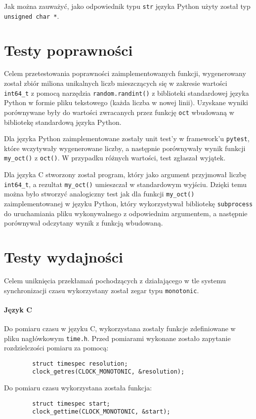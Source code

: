 \documentclass[11pt]{article}
\begin{document}
	Jak można zauważyć, jako odpowiednik typu \texttt{str} języka Python użyty został typ \texttt{unsigned char *}.

	\section{Testy poprawności}
	Celem przetestowania poprawności zaimplementowanych funkcji, 
	wygenerowany został zbiór miliona unikalnych liczb mieszczących się w zakresie wartości \texttt{int64\_t} 
	z pomocą narzędzia \texttt{random.randint()} z biblioteki standardowej języka Python w formie pliku tekstowego
	(każda liczba w nowej linii). Uzyskane wyniki porównywane były do wartości zwracanych przez funkcję \texttt{oct}
	wbudowaną w bibliotekę standardową języka Python.

	Dla języka Python zaimplementowane zostały unit test'y w framework'u \texttt{pytest}, które wczytywały wygenerowane
	liczby, a następnie porównywały wynik funkcji \texttt{my\_oct()} z \texttt{oct()}. W przypadku różnych wartości, test zgłaszał wyjątek.
	
	Dla języka C stworzony został program, który jako argument przyjmował liczbę \texttt{int64\_t}, a rezultat \texttt{my\_oct()}
	umieszczał w standardowym wyjściu. Dzięki temu można było stworzyć analogiczny test jak dla funkcji \texttt{my\_oct()} zaimplementowanej w języku Python, który wykorzystywał
	bibliotekę \texttt{subprocess} do uruchamiania pliku wykonywalnego z odpowiednim argumentem, a następnie porównywał odczytany wynik z funkcją wbudowaną.
	
	\section{Testy wydajności}
		Celem uniknięcia przekłamań pochodzących z działającego w tle systemu synchronizacji czasu
		wykorzystany został zegar typu \texttt{monotonic}.

		\paragraph{Język C}
		Do pomiaru czasu w języku C, wykorzystana zostały funkcje zdefiniowane w pliku nagłówkowym \texttt{time.h}.
		Przed pomiarami wykonane zostało zapytanie rozdzielczości pomiaru za pomocą:
		\begin{lstlisting}
		struct timespec resolution;
		clock_getres(CLOCK_MONOTONIC, &resolution);
		\end{lstlisting}
		Do pomiaru czasu wykorzystana została funkcja:
		\begin{lstlisting}
		struct timespec start;
		clock_gettime(CLOCK_MONOTONIC, &start);
		\end{lstlisting}
\end{document}
